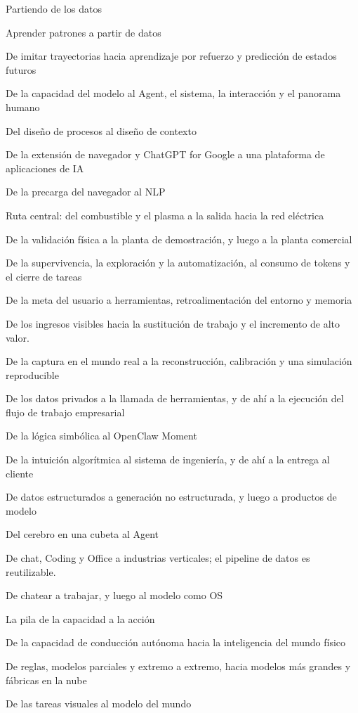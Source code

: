 \documentclass{article}
\begin{document}
Partiendo de los datos

Aprender patrones a partir de datos

De imitar trayectorias hacia aprendizaje por refuerzo y predicción de estados futuros

De la capacidad del modelo al Agent, el sistema, la interacción y el panorama humano

Del diseño de procesos al diseño de contexto

De la extensión de navegador y ChatGPT for Google a una plataforma de aplicaciones de IA

De la precarga del navegador al NLP

Ruta central: del combustible y el plasma a la salida hacia la red eléctrica

De la validación física a la planta de demostración, y luego a la planta comercial

De la supervivencia, la exploración y la automatización, al consumo de tokens y el cierre de tareas

De la meta del usuario a herramientas, retroalimentación del entorno y memoria

De los ingresos visibles hacia la sustitución de trabajo y el incremento de alto valor.

De la captura en el mundo real a la reconstrucción, calibración y una simulación reproducible

De los datos privados a la llamada de herramientas, y de ahí a la ejecución del flujo de trabajo empresarial

De la lógica simbólica al OpenClaw Moment

De la intuición algorítmica al sistema de ingeniería, y de ahí a la entrega al cliente

De datos estructurados a generación no estructurada, y luego a productos de modelo

Del cerebro en una cubeta al Agent

De chat, Coding y Office a industrias verticales; el pipeline de datos es reutilizable.

De chatear a trabajar, y luego al modelo como OS

La pila de la capacidad a la acción

De la capacidad de conducción autónoma hacia la inteligencia del mundo físico

De reglas, modelos parciales y extremo a extremo, hacia modelos más grandes y fábricas en la nube

De las tareas visuales al modelo del mundo
\end{document}
